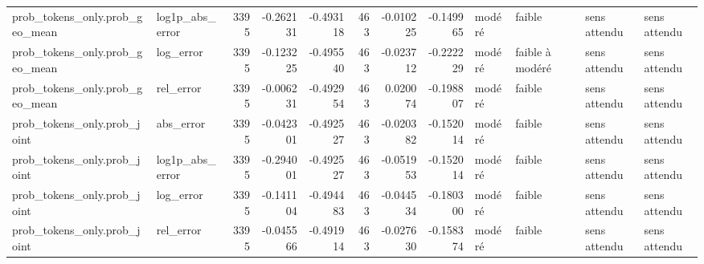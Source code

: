 \begin{longtable}{llrrrrrrllll}
prob\_tokens\_only.prob\_geo\_mean & log1p\_abs\_error & 3395 & -0.262131 & -0.493118 & 463 & -0.010225 & -0.149965 & modéré & faible & sens attendu & sens attendu \\
prob\_tokens\_only.prob\_geo\_mean & log\_error & 3395 & -0.123225 & -0.495540 & 463 & -0.023712 & -0.222229 & modéré & faible à modéré & sens attendu & sens attendu \\
prob\_tokens\_only.prob\_geo\_mean & rel\_error & 3395 & -0.006231 & -0.492954 & 463 & 0.020074 & -0.198807 & modéré & faible & sens attendu & sens attendu \\
prob\_tokens\_only.prob\_joint & abs\_error & 3395 & -0.042301 & -0.492527 & 463 & -0.020382 & -0.152014 & modéré & faible & sens attendu & sens attendu \\
prob\_tokens\_only.prob\_joint & log1p\_abs\_error & 3395 & -0.294001 & -0.492527 & 463 & -0.051953 & -0.152014 & modéré & faible & sens attendu & sens attendu \\
prob\_tokens\_only.prob\_joint & log\_error & 3395 & -0.141104 & -0.494483 & 463 & -0.044534 & -0.180300 & modéré & faible & sens attendu & sens attendu \\
prob\_tokens\_only.prob\_joint & rel\_error & 3395 & -0.045566 & -0.491914 & 463 & -0.027630 & -0.158374 & modéré & faible & sens attendu & sens attendu \\
\end{longtable}
